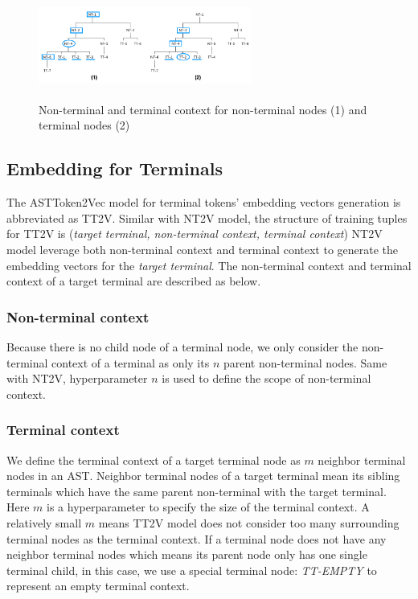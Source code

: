 \documentclass[E]{compsoft}
\begin{document}
\begin{figure}[!ht]
\centering
\includegraphics[width=7cm, height=3.5cm]{pictures/node2vec_context.png}
\caption{Non-terminal and terminal context for non-terminal nodes (1) and terminal nodes (2)}
\label{fig:node2vec-context}
\end{figure}





\subsection{Embedding for Terminals}
\label{sub:embedding_tt}
The ASTToken2Vec model for terminal tokens' embedding vectors generation is abbreviated as TT2V.
Similar with NT2V model, the structure of training tuples for TT2V is (\textit{target terminal, non-terminal context, terminal context}) 
NT2V model leverage both non-terminal context and terminal context to generate the embedding vectors for the \textit{target terminal}.
The non-terminal context and terminal context of a target terminal are described as below.

\subsubsection{Non-terminal context} 
Because there is no child node of a terminal node, we only consider the non-terminal context of a terminal as only its $n$ parent non-terminal nodes. 
Same with NT2V, hyperparameter $n$ is used to define the scope of non-terminal context.

\subsubsection{Terminal context} 
We define the terminal context of a target terminal node as $m$ neighbor terminal nodes in an AST. 
Neighbor terminal nodes of a target terminal mean its sibling terminals which have the same parent non-terminal with the target terminal.
Here $m$ is a hyperparameter to specify the size of the terminal context. 
A relatively small $m$ means TT2V model does not consider too many surrounding terminal nodes as the terminal context. 
If a terminal node does not have any neighbor terminal nodes which means its parent node only has one single terminal child, in this case, we use a special terminal node: \textit{TT-EMPTY} to represent an empty terminal context. 
\end{document}
